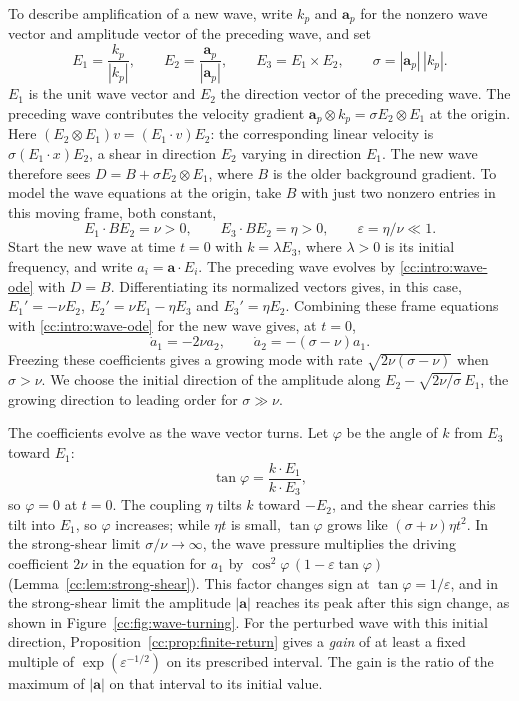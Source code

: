 To describe amplification of a new wave, write $k_p$ and $\mathbf a_p$
for the nonzero wave vector and amplitude vector of the preceding wave,
and set
\[
 E_1=\frac{k_p}{|k_p|},\qquad
 E_2=\frac{\mathbf a_p}{|\mathbf a_p|},\qquad E_3=E_1\times E_2,
 \qquad \sigma=|\mathbf a_p|\,|k_p|.
\]
$E_1$ is the unit wave vector and $E_2$ the direction vector of the
preceding wave.
The preceding wave contributes the velocity gradient
$\mathbf a_p\otimes k_p=\sigma E_2\otimes E_1$ at the origin.
Here $(E_2\otimes E_1)v=(E_1\cdot v)E_2$: the corresponding linear
velocity is $\sigma(E_1\cdot x)E_2$, a shear in direction $E_2$
varying in direction $E_1$. The new wave therefore sees
$D=B+\sigma E_2\otimes E_1$, where $B$ is the older background gradient.
To model the wave equations at the origin, take $B$ with just two
nonzero entries in this moving frame, both constant,
\[
 E_1\cdot BE_2=\nu>0,\qquad E_3\cdot BE_2=\eta>0,
 \qquad \varepsilon=\eta/\nu\ll1.
\]
Start the new wave at time $t=0$ with $k=\lambda E_3$, where $\lambda>0$
is its initial frequency, and write $a_i=\mathbf a\cdot E_i$. The
preceding wave evolves by \eqref{cc:intro:wave-ode} with $D=B$.
Differentiating its normalized vectors gives, in this case,
$E_1'=-\nu E_2$, $E_2'=\nu E_1-\eta E_3$ and $E_3'=\eta E_2$.
Combining these frame equations with \eqref{cc:intro:wave-ode} for the
new wave gives, at $t=0$,
\[
 \dot a_1=-2\nu a_2,\qquad
 \dot a_2=-(\sigma-\nu)a_1.
\]
Freezing these coefficients gives a growing mode with rate
$\sqrt{2\nu(\sigma-\nu)}$ when $\sigma>\nu$. We choose the initial
direction of the amplitude along $E_2-\sqrt{2\nu/\sigma}\,E_1$, the growing direction
to leading order for $\sigma\gg\nu$.

The coefficients evolve as the wave vector turns. Let $\varphi$
be the angle of $k$ from $E_3$ toward $E_1$:
\[
 \tan\varphi=\frac{k\cdot E_1}{k\cdot E_3},
\]
so $\varphi=0$ at $t=0$. The coupling $\eta$ tilts $k$ toward $-E_2$,
and the shear carries this tilt into $E_1$, so $\varphi$ increases;
while $\eta t$ is small, $\tan\varphi$ grows like $(\sigma+\nu)\eta t^2$.
In the strong-shear limit $\sigma/\nu\to\infty$, the wave pressure
multiplies the driving coefficient $2\nu$ in the equation for $a_1$ by
$\cos^2\varphi\,(1-\varepsilon\tan\varphi)$
(Lemma~\ref{cc:lem:strong-shear}). This factor changes sign
at $\tan\varphi=1/\varepsilon$, and in the strong-shear limit the
amplitude $|\mathbf a|$ reaches its peak after this sign change, as shown
in Figure~\ref{cc:fig:wave-turning}.
For the perturbed wave with this initial direction,
Proposition~\ref{cc:prop:finite-return} gives a \emph{gain} of at least
a fixed multiple of $\exp(\varepsilon^{-1/2})$ on its prescribed interval.
The gain is the ratio of the maximum of $|\mathbf a|$ on that interval
to its initial value.

